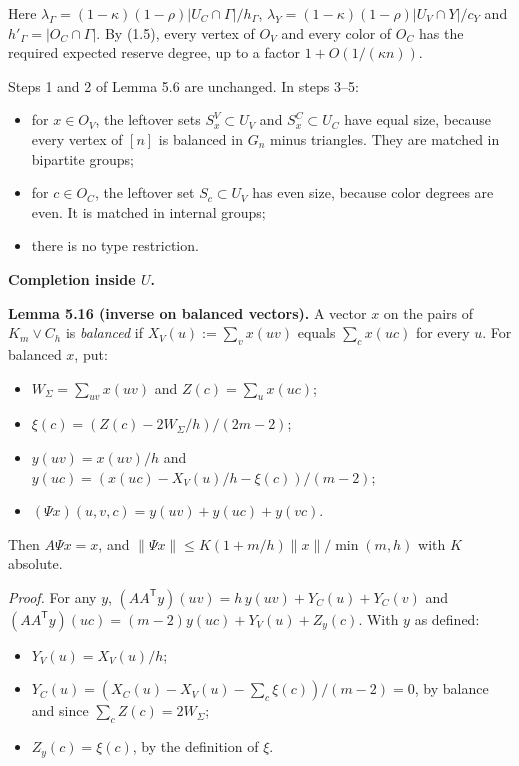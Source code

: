 \documentclass[english,11pt,a4paper]{article}
\providecommand{\tightlist}{\setlength{\itemsep}{0pt}\setlength{\parskip}{0pt}}
\begin{document}
Here \(\lambda_\Gamma=(1-\kappa)(1-\rho)|U_C\cap\Gamma|/h_\Gamma\), \(\lambda_Y=(1-\kappa)(1-\rho)|U_V\cap Y|/c_Y\) and \(h'_\Gamma=|O_C\cap\Gamma|\). By (1.5), every vertex of \(O_V\) and every color of \(O_C\) has the required expected reserve degree, up to a factor \(1+O(1/(\kappa n))\).

Steps 1 and 2 of Lemma 5.6 are unchanged. In steps 3--5:

\begin{itemize}
\tightlist
\item
  for \(x\in O_V\), the leftover sets \(S^V_x\subset U_V\) and \(S^C_x\subset U_C\) have equal size, because every vertex of \([n]\) is balanced in \(G_n\) minus triangles. They are matched in bipartite groups;
\item
  for \(c\in O_C\), the leftover set \(S_c\subset U_V\) has even size, because color degrees are even. It is matched in internal groups;
\item
  there is no type restriction.
\end{itemize}

\textbf{Completion inside \(U\).}

\textbf{Lemma 5.16 (inverse on balanced vectors).} A vector \(x\) on the pairs of \(K_m\vee C_h\) is \emph{balanced} if \(X_V(u):=\sum_vx(uv)\) equals \(\sum_cx(uc)\) for every \(u\). For balanced \(x\), put:

\begin{itemize}
\tightlist
\item
  \(W_\Sigma=\sum_{uv}x(uv)\) and \(Z(c)=\sum_ux(uc)\);
\item
  \(\xi(c)=(Z(c)-2W_\Sigma/h)/(2m-2)\);
\item
  \(y(uv)=x(uv)/h\) and \(y(uc)=(x(uc)-X_V(u)/h-\xi(c))/(m-2)\);
\item
  \((\Psi x)(u,v,c)=y(uv)+y(uc)+y(vc)\).
\end{itemize}

Then \(A\Psi x=x\), and \(\|\Psi x\|\le K(1+m/h)\|x\|/\min(m,h)\) with \(K\) absolute.

\emph{Proof.} For any \(y\), \((AA^{\mathsf T}y)(uv)=h\,y(uv)+Y_C(u)+Y_C(v)\) and \((AA^{\mathsf T}y)(uc)=(m-2)y(uc)+Y_V(u)+Z_y(c)\). With \(y\) as defined:

\begin{itemize}
\tightlist
\item
  \(Y_V(u)=X_V(u)/h\);
\item
  \(Y_C(u)=(X_C(u)-X_V(u)-\sum_c\xi(c))/(m-2)=0\), by balance and since \(\sum_cZ(c)=2W_\Sigma\);
\item
  \(Z_y(c)=\xi(c)\), by the definition of \(\xi\).
\end{itemize}
\end{document}
